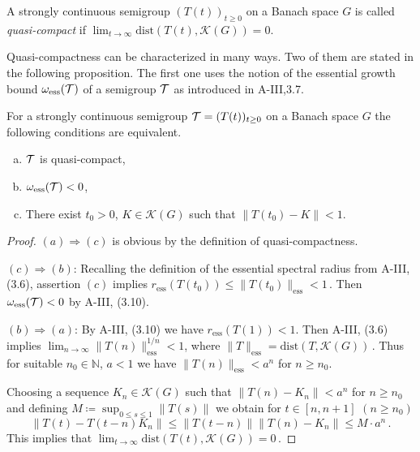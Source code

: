 \begin{definition}\label{def:b4-2.7}
	A strongly continuous semigroup $(T(t))_{t \geq 0}$ on a Banach
	space $G$ is called \emph{quasi-compact} if $\lim_{t\to\infty}\text{dist}(T(t),\mathcal{K}(G)) = 0$.
\end{definition}

Quasi-compactness can be characterized in many ways.
Two of them are stated in the following proposition.
The first one uses the notion of the essential growth bound $\omega_{\text{ess}}(\mathcal{T})$ of a semigroup $\mathcal{T}$ as introduced in A-III,3.7.

\begin{proposition}\label{prop:b4-2.8}
	For a strongly continuous semigroup $\mathcal{T} = (T(t))_{t \geq 0}$
	on a Banach space $G$ the following conditions are equivalent.
	\begin{enumerate}[(a)]
		\item
		$\mathcal{T}$ is quasi-compact,
	
		\item 
		$\omega_{\text{ess}}(\mathcal{T}) < 0$,
	
		\item 
		There exist $t_{0} > 0$, $K \in \mathcal{K}(G)$ such that $\|T(t_{0}) - K\| < 1$.
	\end{enumerate}
\end{proposition}

%
%
\begin{proof}
	$(a)\Rightarrow(c)$ is obvious by the definition of quasi-compactness.
	
	$(c)\Rightarrow(b)$: Recalling the definition of the essential spectral radius from A-III, (3.6), assertion $(c)$ implies 
	$r_{\text{ess}}(T(t_0)) \leq \|T(t_0)\|_{\text{ess}} < 1\,.$ 
	Then  $\omega_{\text{ess}}(\mathcal{T}) < 0 $ by A-III, (3.10).
	
	$(b)\Rightarrow(a)$: By A-III, (3.10) we have $r_{\text{ess}}(T(1)) < 1$. Then A-III, (3.6) implies 
	$\lim_{n \to \infty}\|T(n)\|_{\text{ess}}^{1/n} < 1$,  where $\|T\|_{\text{ess}} = \mathrm{dist}(T,\mathcal{K}(G))$\,. Thus for suitable $n_{0} \in \mathbb{N}$, $a < 1$ we have $\|T(n)\|_{\text{ess}} < a^n$ for $n \geq n_{0}$.
	
	Choosing a sequence $K_n \in \mathcal{K}(G)$ such that $\|T(n) - K_n\| < a^n$ for $n \geq n_{0}$ and defining $M \coloneqq \sup_{0 \leq s \leq 1}\|T(s)\|$ we obtain for $t \in [n,n+1]$ $(n \geq n_{0})$ 
	\[
	\|T(t) - T(t-n)K_n\| \leq \|T(t-n)\|\|T(n) - K_n\| \leq M \cdot a^n\,.
	\] 
	This implies that $\lim_{t \to \infty}\mathrm{dist}(T(t),\mathcal{K}(G)) = 0\,.$
	\end{proof}
	
